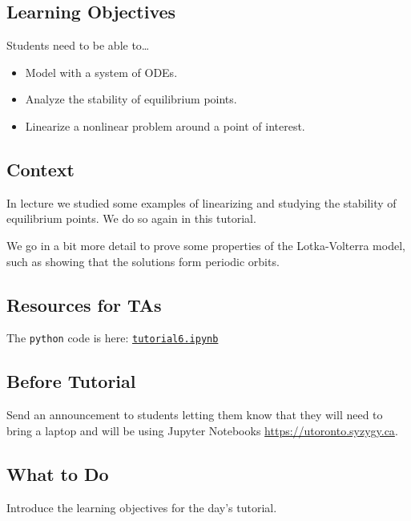 \subsection*{Learning Objectives}
	Students need to be able to\ldots
		\begin{itemize}\it 
			\item Model with a system of ODEs. \\[-20pt]
			\item Analyze the stability of equilibrium points. \\[-20pt]
			\item Linearize a nonlinear problem around a point of interest.
		\end{itemize}


%	
\subsection*{Context}
	
In lecture we studied some examples  of linearizing and studying the stability of equilibrium points.
We do so again in this tutorial.

We go in a bit more detail to prove some properties of the Lotka-Volterra model, such as showing that the solutions form periodic orbits.



\subsection*{Resources for TAs}

The \verb|python| code is here: \href{https://utoronto.syzygy.ca/jupyter/user-redirect/git-pull?repo=https://github.com/bigfatbernie/IBLMathModeling&subPath=tutorials/tutorial6/tutorial6.ipynb}{\tt tutorial6.ipynb}


\subsection*{Before Tutorial}


Send an announcement to students letting them know that they will need to bring a laptop and will be using Jupyter Notebooks \url{https://utoronto.syzygy.ca}.


\subsection*{What to Do}
	
Introduce the learning objectives for the day's tutorial. \\

